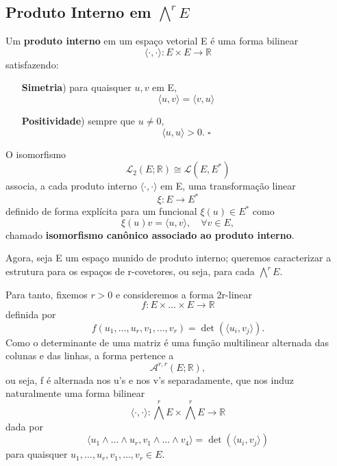 \documentclass[../differential_forms.tex]{subfiles}
\begin{document}
\subsection{Produto Interno em \(\bigwedge^{r}E\)}
\begin{def*}
	Um \textbf{produto interno} em um espaço vetorial E é uma forma bilinear
	\[
		\langle \cdot , \cdot  \rangle:E\times E\rightarrow \mathbb{R}
	\]
	satisfazendo:
	\begin{itemize}
		\item[\textbf{Simetria})] para quaisquer \(u, v\) em E,
		      \[
			      \langle u, v \rangle = \langle v, u \rangle
		      \]
		\item[\textbf{Positividade})] sempre que \(u\neq 0\),
		      \[
			      \langle u, u \rangle > 0. \;\square
		      \]
	\end{itemize}
\end{def*}
O isomorfismo
\[
	\mathcal{L}_2(E; \mathbb{R})\cong  \mathcal{L}(E, E^{*})
\]
associa, a cada produto interno \(\langle \cdot , \cdot  \rangle\) em E, uma transformação linear
\[
	\xi :E\rightarrow E^{*}
\]
definido de forma explícita para um funcional \(\xi (u)\in E^{*}\) como
\[
	\xi (u)v = \langle u, v \rangle,\quad \forall v\in E,
\]
chamado \textbf{isomorfismo canônico associado ao produto interno}.

Agora, seja E um espaço munido de produto interno; queremos caracterizar a estrutura para os espaços de r-covetores, ou seja, para cada \(\bigwedge^{r}E\).

Para tanto, fixemos \(r>0\) e consideremos a forma 2r-linear
\[
	f:E\times \dotsc \times E\rightarrow \mathbb{R}
\]
definida por
\[
	f(u_1, \dotsc , u_r, v_1, \dotsc , v_r) = \det{(\langle u_{i}, v_{j} \rangle)}.
\]
Como o determinante de uma matriz é uma função multilinear alternada das colunas e das linhas, a forma pertence a
\[
	\mathcal{A}^{r, r}(E; \mathbb{R}),
\]
ou seja, f é alternada nos u's e nos v's separadamente, que nos induz naturalmente uma forma bilinear
\[
	\langle \cdot , \cdot  \rangle:\bigwedge^{r}E \times \bigwedge^{r}E\rightarrow \mathbb{R}
\]
dada por
\[
	\langle u_1\wedge \dotsc \wedge u_r, v_1\wedge \dotsc \wedge v_4 \rangle = \det{(\langle u_{i}, v_{j} \rangle)}
\]
para quaisquer \(u_1, \dotsc , u_r, v_1, \dotsc , v_r\in E\).
\end{document}
